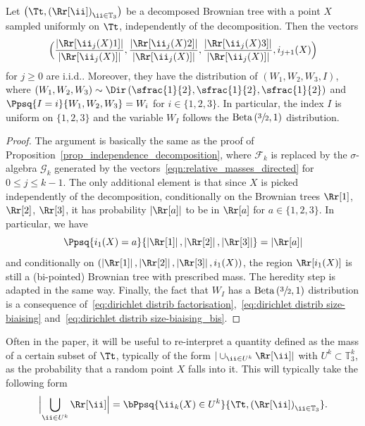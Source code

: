 \begin{lemma}\label{lem_independence_pointed_decomposition}
Let $\left( \Tt, \left( \Rr[\ii] \right)_{\ii \in \mathbb{T}_3} \right)$ be a decomposed Brownian tree with a point $X$ sampled uniformly on $\Tt$, independently of the decomposition.
Then the vectors
\begin{equation}\label{eqn:relative_masses_directed}
\Bigl( \frac{\left| \Rr[\ii _j(X)1] \right|}{\left| \Rr[\ii _j(X)] \right|}, \frac{\left| \Rr[\ii _j(X)2] \right|}{\left| \Rr[\ii _j(X)] \right|}, \frac{\left| \Rr[\ii _j(X)3] \right|}{\left| \Rr[\ii _j(X)] \right|}, i_{j+1}(X) \Bigr)
\end{equation}
for $j \geq 0$ are i.i.d.. Moreover, they have the distribution of $(W_1, W_2, W_3, I)$, where $(W_1, W_2, W_3) \sim \Dir \left( \sfrac{1}{2}, \sfrac{1}{2}, \sfrac{1}{2} \right)$ and $\Ppsq{ I=i}{W_1, W_2, W_3}=W_i$ for $i \in \{1,2,3\}$. In particular, the index $I$ is uniform on $\{1,2,3\}$ and the variable $W_I$ follows the $\mathrm{Beta}\left( \sfrac{3}{2},1 \right)$ distribution.
\end{lemma}

\begin{proof}
The argument is basically the same as the proof of Proposition~\ref{prop_independence_decomposition}, where $\mathcal{F}_k$ is replaced by the $\sigma$-algebra $\mathcal{G}_k$ generated by the vectors~\eqref{eqn:relative_masses_directed} for $0 \leq j \leq k-1$.
The only additional element is that since $X$ is picked independently of the decomposition, conditionally on the Brownian trees $\Rr[1]$, $\Rr[2]$, $\Rr[3]$, it has probability $\left| \Rr[a] \right|$ to be in $\Rr[a]$ for $a \in \{1,2,3\}$.
In particular, we have
\[ \Ppsq{i_1(X)=a}{\left| \Rr[1] \right|, \left| \Rr[2] \right|, \left| \Rr[3] \right|} = |\Rr[a]| \]
and conditionally on $\left( \left| \Rr[1] \right|, \left| \Rr[2] \right|, \left| \Rr[3] \right|, i_1(X) \right)$, the region $\Rr[i_1(X)]$ is still a (bi-pointed) Brownian tree with prescribed mass. The heredity step is adapted in the same way.
Finally, the fact that $W_I$ has a $\mathrm{Beta}\left(\sfrac{3}{2},1\right)$ distribution is a consequence of~\eqref{eq:dirichlet distrib factorisation},~\eqref{eq:dirichlet distrib size-biaising} and~\eqref{eq:dirichlet distrib size-biaising_bis}.
\end{proof}
\begin{remark}\label{rem:mass in Tt as probability}
Often in the paper, it will be useful to re-interpret a quantity defined as the mass of a certain subset of $\Tt$, typically of the form $|\cup_{\ii \in U^k}\Rr[\ii]|$ with $U^k \subset \mathbb{T}_3^k$, as the probability that a random point $X$ falls into it. This will typically take the following form
\begin{align*}
\Bigl|\bigcup_{\ii \in U^k}\Rr[\ii]\Bigr| = \bPpsq{\ii_k(X)\in U^k}{\Tt, \left( \Rr[\ii] \right)_{\ii \in \mathbb{T}_3} }.
\end{align*}
\end{remark}
